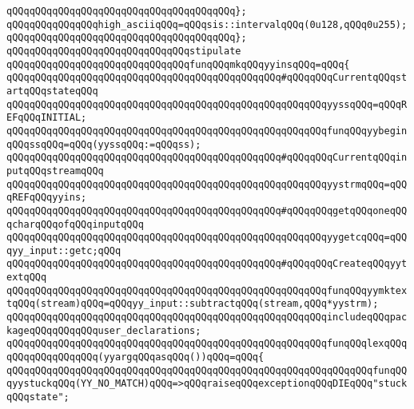\verb|qQQqqQQqqQQqqQQqqQQqqQQqqQQqqQQqqQQqqQQq};|\newline
\newline
\verb|qQQqqQQqqQQqqQQqhigh_asciiqQQq=qQQqsis::intervalqQQq(0u128,qQQq0u255);|\newline
\newline
\newline
\newline
\verb|qQQqqQQqqQQqqQQqqQQqqQQqqQQqqQQqqQQqqQQq};|\newline
\newline
\verb|qQQqqQQqqQQqqQQqqQQqqQQqqQQqqQQqstipulate|\newline
\verb|qQQqqQQqqQQqqQQqqQQqqQQqqQQqqQQqfunqQQqmkqQQqyyinsqQQq=qQQq{|\newline
\verb|qQQqqQQqqQQqqQQqqQQqqQQqqQQqqQQqqQQqqQQqqQQqqQQq#qQQqqQQqCurrentqQQqstartqQQqstateqQQq|\newline
\verb|qQQqqQQqqQQqqQQqqQQqqQQqqQQqqQQqqQQqqQQqqQQqqQQqqQQqqQQqyyssqQQq=qQQqREFqQQqINITIAL;|\newline
\verb|qQQqqQQqqQQqqQQqqQQqqQQqqQQqqQQqqQQqqQQqqQQqqQQqqQQqqQQqfunqQQqyybeginqQQqssqQQq=qQQq(yyssqQQq:=qQQqss);|\newline
\verb|qQQqqQQqqQQqqQQqqQQqqQQqqQQqqQQqqQQqqQQqqQQqqQQq#qQQqqQQqCurrentqQQqinputqQQqstreamqQQq|\newline
\verb|qQQqqQQqqQQqqQQqqQQqqQQqqQQqqQQqqQQqqQQqqQQqqQQqqQQqqQQqyystrmqQQq=qQQqREFqQQqyyins;|\newline
\verb|qQQqqQQqqQQqqQQqqQQqqQQqqQQqqQQqqQQqqQQqqQQqqQQq#qQQqqQQqgetqQQqoneqQQqcharqQQqofqQQqinputqQQq|\newline
\verb|qQQqqQQqqQQqqQQqqQQqqQQqqQQqqQQqqQQqqQQqqQQqqQQqqQQqqQQqyygetcqQQq=qQQqyy_input::getc;qQQq|\newline
\verb|qQQqqQQqqQQqqQQqqQQqqQQqqQQqqQQqqQQqqQQqqQQqqQQq#qQQqqQQqCreateqQQqyytextqQQq|\newline
\verb|qQQqqQQqqQQqqQQqqQQqqQQqqQQqqQQqqQQqqQQqqQQqqQQqqQQqqQQqfunqQQqyymktextqQQq(stream)qQQq=qQQqyy_input::subtractqQQq(stream,qQQq*yystrm);|\newline
\verb|qQQqqQQqqQQqqQQqqQQqqQQqqQQqqQQqqQQqqQQqqQQqqQQqqQQqqQQqincludeqQQqpackageqQQqqQQqqQQquser_declarations;|\newline
\verb|qQQqqQQqqQQqqQQqqQQqqQQqqQQqqQQqqQQqqQQqqQQqqQQqqQQqqQQqfunqQQqlexqQQq|\newline
\verb|qQQqqQQqqQQqqQQq(yyargqQQqasqQQq())qQQq=qQQq{|\newline
\verb|qQQqqQQqqQQqqQQqqQQqqQQqqQQqqQQqqQQqqQQqqQQqqQQqqQQqqQQqqQQqqQQqfunqQQqyystuckqQQq(YY_NO_MATCH)qQQq=>qQQqraiseqQQqexceptionqQQqDIEqQQq"stuckqQQqstate";|\newline
